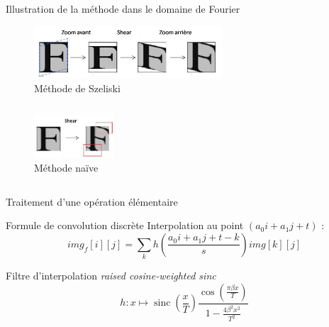 \documentclass[c,12pt]{beamer}
\DeclareMathOperator{\sinc}{sinc}
\begin{document}
\begin{frame}{Illustration de la méthode dans le domaine de Fourier }

\begin{figure}
\centering
\includegraphics[width=7cm]{fourier1.jpg}
\caption{Méthode de Szeliski}
\end{figure}

\begin{columns}
\begin{column}{4cm}

\begin{figure}
\centering
\includegraphics[width=3cm]{fourier2.jpg}
\caption{Méthode naïve}
\end{figure}

\end{column}
\end{columns}

\end{frame}


\begin{frame}{Traitement d'une opération élémentaire}


\begin{block}{Formule de convolution discrète}
Interpolation au point $ (a_0i+a_1j+t)$ :
	\begin{equation*}
	img_f[i][j] = \displaystyle{\sum_k}h\left(\frac{a_0i+a_1j+t-k}{s}\right)img[k][j]
	\label{formule_convolution_discrete}
	\end{equation*}

\end{block}


\begin{block}{Filtre d'interpolation }
	 \emph{raised cosine-weighted sinc}
	\begin{equation*}
	h : x \mapsto \sinc(\frac{x}{T})\frac{\cos(\frac{\pi\beta x}{T})}{1-\frac{4\beta^2x^2}{T^2}}
	\label{szeliski_definition_raisedCosineWeightedSinc}
	\end{equation*}
\end{block}

\end{frame}
\end{document}
